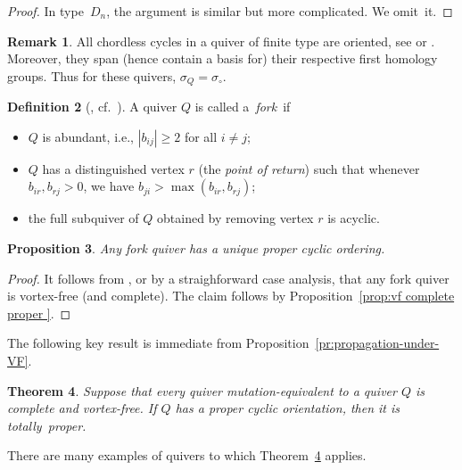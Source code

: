 \documentclass[11pt, letterpaper]{amsart}
\newtheorem{theorem}{Theorem}[section]
\newtheorem{proposition}[theorem]{Proposition}
\theoremstyle{definition}
\newtheorem{remark}[theorem]{Remark}
\newtheorem{definition}[theorem]{Definition}
\numberwithin{equation}{section}
\begin{document}
\begin{proof}
In type~$D_n$, the argument is similar but more complicated. We omit~it. 
\end{proof}


\begin{remark}
All chordless cycles in a quiver of finite type are oriented,
see \cite[Proposition~9.7]{ca2} or \cite[Theorem~1.2]{BGZ}. %
Moreover, they span (hence contain a basis for) their respective first homology groups.
Thus for these quivers, $\sigma_Q = \sigma_{\circ}$.
\end{remark}

\begin{definition}[{\cite[Definition~2.1]{Warkentin}, cf.\ \cite[Section~6]{LMC}}]
\label{def:fork}
A quiver $Q$ is called a~\emph{fork}~if 
\begin{itemize}[leftmargin=.2in]
\item 
$Q$ is abundant, i.e., $|b_{ij}| \geq 2$ for all $i\neq j$; 
\item
$Q$ has a distinguished vertex $r$ (the \emph{point of return}) such that whenever $b_{ir}, b_{rj} > 0$, we have 
$b_{ji} > \max(b_{ir}, b_{rj})$; 
\item
the full subquiver of $Q$ obtained by removing vertex $r$ is acyclic.
\end{itemize}
\end{definition}


\begin{proposition}
\label{prop: fork vf}
Any fork quiver has a unique proper cyclic ordering. 
\end{proposition}

\begin{proof}
It follows from \cite[Section~6]{LMC}, or by a straighforward case analysis, 
that any fork quiver is vortex-free (and complete).
The claim follows by Proposition~\ref{prop:vf complete proper }. 
\end{proof}



The following key result is immediate from Proposition~\ref{pr:propagation-under-VF}. 

\begin{theorem}
\label{th:completeVF}
Suppose that every quiver mutation-equivalent to a quiver $Q$ is complete and vortex-free. 
If $Q$ has a proper cyclic orientation, then it is totally~proper.
\end{theorem}


There are many examples of quivers to which Theorem~\ref{th:completeVF} applies.
\end{document}
